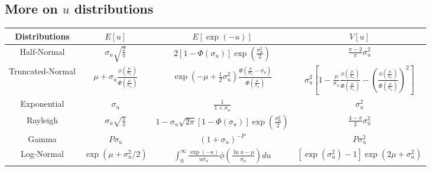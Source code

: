 \documentclass[nojss]{jss}
\begin{document}
\newpage

\begin{appendix}

\section{More on $u$ distributions}\label{app:moredens}

\setcounter{table}{0}
\renewcommand{\thetable}{\Alph{section}\arabic{table}}

\begin{table}[h]
\renewcommand{\arraystretch}{1.3}
\centering
\begin{adjustbox}{max width=1\textwidth}
\begin{tabular}{@{}cccc@{}}
\toprule
Distributions & $E\left[u\right]$ & $E\left[\exp{\left(-u\right)}\right]$ & $V\left[u\right]$ \\
\midrule
Half-Normal & $\sigma_u\sqrt{\frac{2}{\pi}}$ & $2\left[1-\Phi\left(\sigma_u\right)\right]\exp{\left(\frac{\sigma_u^2}{2}\right)}$ & 
$\frac{\pi-2}{\pi}\sigma_u^2$ \\[1em]
Truncated-Normal & $\mu + \sigma_u\frac{\phi\left(\frac{\mu}{\sigma_u}\right)}{\Phi\left(\frac{\mu}{\sigma_u}\right)}$ & 
$\exp{\left(-\mu + \frac{1}{2}\sigma_u^2\right)}\frac{\Phi\left(\frac{\mu}{\sigma_u} - \sigma_u\right)}{\Phi\left(\frac{\mu}{\sigma_u}\right)}$ & 
$\sigma_u^2\left[1 - \frac{\mu}{\sigma_u} \frac{\phi\left(\frac{\mu}{\sigma_u}\right)}{\Phi\left(\frac{\mu}{\sigma_u}\right)} - \left(\frac{\phi\left(\frac{\mu}{\sigma_u}\right)}{\Phi\left(\frac{\mu}{\sigma_u}\right)}\right)^2\right]$\\[1em]
Exponential & $\sigma_u$ & $\frac{1}{1+\sigma_u}$ & $\sigma_u^2$\\[1em]
Rayleigh & $\sigma_u\sqrt{\frac{\pi}{2}}$ & $1 - \sigma_u\sqrt{2\pi}\left[1-\Phi\left(\sigma_u\right)\right]\exp{\left(\frac{\sigma_u^2}{2}\right)}$ &
$\frac{4-\pi}{2}\sigma_u^2$\\[1em]
Gamma & $P\sigma_u$ & $\left(1+\sigma_u\right)^{-P}$ & $P\sigma_u^2$\\[1em]
Log-Normal & $\exp{\left(\mu +\sigma_u^2/2\right)}$ & $\int_0^\infty \frac{\exp{\left(-u\right)}}{u\sigma_u}\phi\left(\frac{\ln{u}-\mu}{\sigma_u}\right)du$ & 
$\left[\exp{\left(\sigma_u^2\right)}-1\right]\exp{\left(2\mu +\sigma_u^2\right)}$\\[1em]

\end{tabular}
\end{adjustbox}
\end{table}
\end{appendix}
\end{document}
